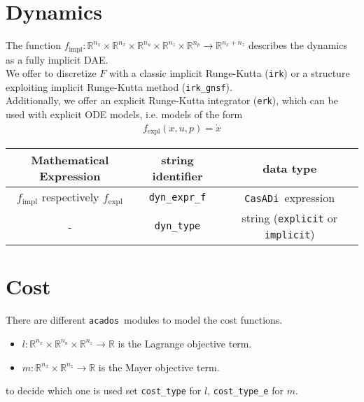\documentclass{article}
\newcommand{\code}[1]{\texttt{#1}}
\newcommand{\casadi}{\texttt{CasADi}}
\newcommand{\acados}{\texttt{acados}}
\newcommand{\ind}[1]{_{\textrm{#1}}}
\begin{document}
\section{Dynamics}
The function $ f\ind{impl}: \mathbb{R}^{n_x}\times\mathbb{R}^{n_x}\times\mathbb{R}^{n_u}\times\mathbb{R}^{n_z}\times\mathbb{R}^{n_p} \rightarrow \mathbb{R}^{n_x+n_z}$ describes the dynamics as a fully implicit DAE.\\
We offer to discretize $ F $ with a classic implicit Runge-Kutta (\code{irk}) or a structure exploiting implicit Runge-Kutta method (\code{irk\_gnsf}).\\
Additionally, we offer an explicit Runge-Kutta integrator (\code{erk}), which can be used with explicit ODE models, i.e. models of the form
\begin{align*}
f\ind{expl}(x,u,p) = \dot{x}
\end{align*}
\begin{table}[h!]
	\centering
	\begin{tabular}{|c|c|c|}
		\toprule
		Mathematical Expression                    & string identifier & data type \\ \midrule
		$ f\ind{impl} $ respectively $ f\ind{expl} $ & \code{dyn\_expr\_f}    & \casadi~expression    \\ \midrule
		- & \code{dyn\_type}    & string (\code{explicit} or \code{implicit})    \\
		\bottomrule
	\end{tabular}
\end{table}


\section{Cost}
There are different \acados~modules to model the cost functions.
\begin{itemize}
\item $ l: \mathbb{R}^{n_x}\times\mathbb{R}^{n_u}\times\mathbb{R}^{n_z} \rightarrow \mathbb{R}$ is the Lagrange objective term.
\item $ m: \mathbb{R}^{n_x}\times\mathbb{R}^{n_z} \rightarrow \mathbb{R} $ is the Mayer objective term.
\end{itemize}
to decide which one is used set \code{cost\_type} for $ l $, \code{cost\_type\_e} for $ m $.
\end{document}
